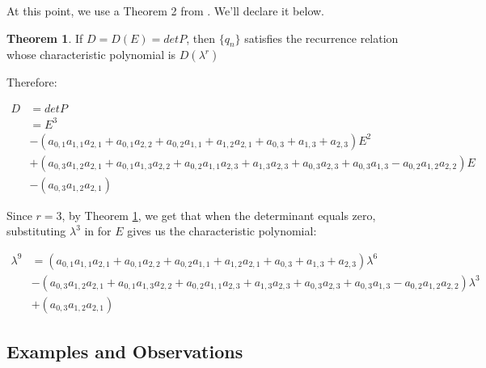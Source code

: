 \documentclass[a4paper]{article}
\theoremstyle{definition}
\newtheorem{theorem}{Theorem}[section]
\begin{document}
At this point, we use a Theorem 2 from \cite{bib:gen_cond_rec}. We'll declare it below.
\\

\begin{theorem}
If $D=D(E)=detP$, then $\{q_n\}$  satisfies the recurrence relation whose characteristic polynomial is
$D(\lambda^r)$
\label{thm:det-is-char-poly-dxr}
\end{theorem}

Therefore:

\begin{align*}
D
&=detP \\
&=E^3 \\
&- (a_{0,1}a_{1,1}a_{2,1}+a_{0,1}a_{2,2}+a_{0,2}a_{1,1}+a_{1,2}a_{2,1}+a_{0,3}+a_{1,3}+a_{2,3})E^2 \\
&+ (a_{0,3}a_{1,2}a_{2,1}+a_{0,1}a_{1,3}a_{2,2}+a_{0,2}a_{1,1}a_{2,3}+a_{1,3}a_{2,3}+a_{0,3}a_{2,3}+a_{0,3}a_{1,3}-a_{0,2}a_{1,2}a_{2,2})E \\
&-(a_{0,3}a_{1,2}a_{2,1})
\end{align*}

Since $r=3$, by Theorem \ref{thm:det-is-char-poly-dxr}, we get that when the determinant equals zero,
substituting $\lambda^3$ in for $E$ gives us the characteristic polynomial:

\begin{align*}
\lambda^9
&= (a_{0,1}a_{1,1}a_{2,1}+a_{0,1}a_{2,2}+a_{0,2}a_{1,1}+a_{1,2}a_{2,1}+a_{0,3}+a_{1,3}+a_{2,3})\lambda^6 \\
&- (a_{0,3}a_{1,2}a_{2,1}+a_{0,1}a_{1,3}a_{2,2}+a_{0,2}a_{1,1}a_{2,3}+a_{1,3}a_{2,3}+a_{0,3}a_{2,3}+a_{0,3}a_{1,3}-a_{0,2}a_{1,2}a_{2,2})\lambda^3 \\
&+(a_{0,3}a_{1,2}a_{2,1})
\end{align*}

\subsection{Examples and Observations}
\end{document}
